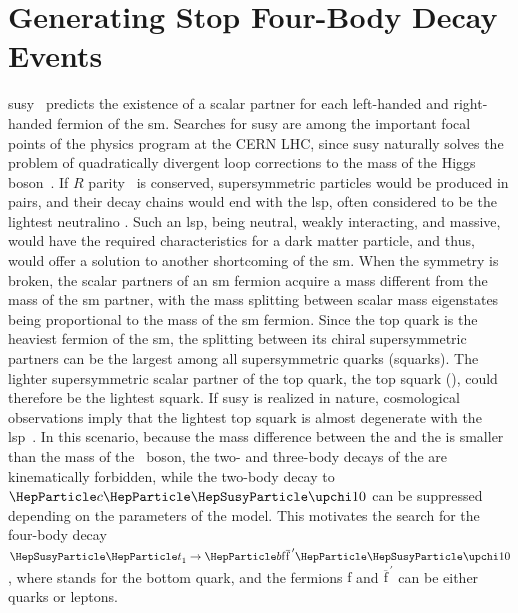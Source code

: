 \section{Generating Stop Four-Body Decay Events}
\label{sec:demo}

\gls{susy}~\cite{Martin,SUSY0,SUSY1,SUSY2,SUSY3,SUSY4} predicts the
existence of a scalar partner for each left-handed and right-handed fermion of
the \gls{sm}.
Searches for \gls{susy} are among the important focal points of the physics 
program at the CERN LHC, since \gls{susy} naturally solves the problem of 
quadratically divergent loop corrections to the mass of the Higgs 
boson~\cite{HgDisc2,HgDisc1,HgDisc3}.
If $R$ parity~\cite{Farrar:1978xj} is conserved, supersymmetric particles would
be produced in pairs, and their decay chains would end with the \gls{lsp}, often
considered to be the lightest neutralino \lsp. Such an \gls{lsp}, being neutral,
weakly interacting, and massive, would have the required characteristics for a 
dark matter particle, and thus, would offer a solution to another shortcoming of
the \gls{sm}.
When the symmetry is broken, the scalar partners of an \gls{sm} fermion acquire 
a mass different from the mass of the \gls{sm} partner, with the mass splitting 
between scalar mass eigenstates being proportional to the mass of the \gls{sm} 
fermion. Since the top quark is the heaviest fermion of the \gls{sm}, the 
splitting between its chiral supersymmetric partners can be the largest among 
all supersymmetric quarks (squarks). The lighter supersymmetric scalar partner 
of the top quark, the top squark (\stp), could therefore be the lightest squark.
If \gls{susy} is realized in nature, cosmological observations imply that the 
lightest top squark is almost degenerate with the \gls{lsp}~\cite{Coannihilation}.
In this scenario, because the mass difference between the \stp and the \PSGczDo 
is smaller than the mass of the \PW\ boson, the two- and three-body decays of 
the \stp are kinematically forbidden, while the two-body decay to $\cPqc\PSGczDo$
can be suppressed depending on the parameters of the model. This motivates the 
search for the four-body decay 
$\stp \to \cPqb \mathrm{f} \overline{\mathrm{f}}^{\,\prime} \PSGczDo$, where 
\cPqb stands for the bottom quark, and the fermions ${\mathrm{f}}$ and 
$\overline{\mathrm{f}}^{\,\prime}$ can be either quarks or leptons. 


